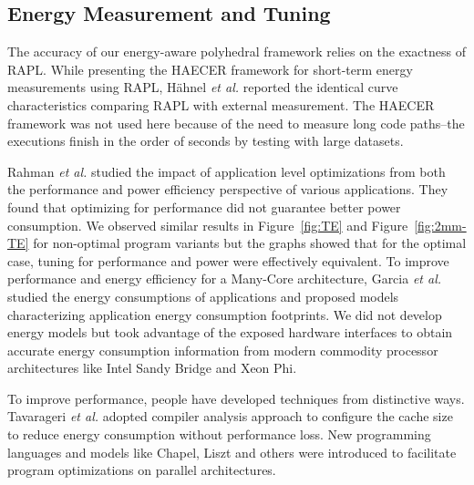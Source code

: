 \subsection{Energy Measurement and Tuning}
The accuracy of our energy-aware polyhedral framework relies on the exactness
of RAPL. While presenting the HAECER framework for short-term energy measurements 
using RAPL, H\"{a}hnel {\it et al.} reported the identical
curve characteristics comparing RAPL with external measurement\cite{RAPL-Related}.
The HAECER framework was not used here because of the need to measure long code
paths--the executions finish in the order of seconds by testing with large datasets.


Rahman {\it et al.}\cite{CF12} studied the impact of application level optimizations from both the 
performance and power efficiency perspective of various applications. They found
that optimizing for performance did not guarantee better power consumption. We 
observed similar results in Figure~\ref{fig:TE} and Figure~\ref{fig:2mm-TE} for non-optimal
program variants but the graphs showed that for the optimal case, tuning for performance and power were 
effectively equivalent. To improve performance and energy efficiency for a Many-Core architecture,
Garcia {\it et al.}\cite{Garcia} studied the energy consumptions of applications and proposed models 
characterizing application energy consumption footprints. We did not
develop energy models but took advantage of the exposed hardware interfaces to obtain accurate   
energy consumption information from modern commodity processor architectures like
Intel Sandy Bridge and Xeon Phi.

To improve performance, people have 
developed techniques from distinctive ways. Tavarageri {\it et al.}\cite{Reduce-Cache} 
adopted compiler analysis approach to configure the cache size to reduce energy consumption
without performance loss. New programming languages\cite{IPDPS13:LULESH} and 
models like Chapel, Liszt and others were introduced to facilitate program optimizations
on parallel architectures.
